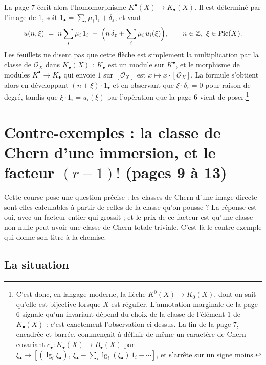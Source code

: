 \documentclass[11pt,a4paper]{article}
\begin{document}
La page 7 écrit alors l'homomorphisme $K^{\bullet}(X) \to K_{\bullet}(X)$. Il
est déterminé par l'image de $1$, soit
$1_{\bullet} = \sum_{i} \mu_{i} 1_{i} + \delta_{\varepsilon}$, et vaut
\[
  u(n, \xi) \;=\; n \sum_{i} \mu_{i}\,1_{i}
  \;+\; \Bigl( n\,\delta_{\varepsilon} + \sum_{i} \mu_{i}\,u_{i}(\xi) \Bigr),
  \qquad n \in \mathbb{Z},\ \xi \in \operatorname{Pic}(X).
\]
Les feuillets ne disent pas que cette flèche est simplement la multiplication par la classe de $\mathcal{O}_{X}$ dans
$K_{\bullet}(X)$ : $K_{\bullet}$ est un module sur $K^{\bullet}$, et le
morphisme de modules $K^{\bullet} \to K_{\bullet}$ qui envoie $1$ sur
$[\mathcal{O}_{X}]$ est $x \mapsto x \cdot [\mathcal{O}_{X}]$. La formule s'obtient alors en développant
$(n + \xi)\cdot 1_{\bullet}$ et en observant que $\xi \cdot \delta_{\varepsilon} = 0$
pour raison de degré, tandis que $\xi \cdot 1_{i} = u_{i}(\xi)$ par l'opération
que la page 6 vient de poser.\footnote{C'est donc, en langage moderne, la flèche
$K^{0}(X) \to K_{0}(X)$, dont on sait qu'elle est bijective lorsque $X$ est
régulier. L'annotation marginale de la page 6 signale qu'un invariant dépend
du choix de la classe de l'élément $1$ de $K_{\bullet}(X)$ : c'est exactement
l'observation ci-dessus. La fin de la page 7, encadrée et barrée, commençait à
définir de même un caractère de Chern covariant $c_{\bullet} :
K_{\bullet}(X) \to B_{\bullet}(X)$ par $\xi_{\bullet} \mapsto
[(\operatorname{lg}_{i}\xi_{\bullet}),\ \xi_{\bullet} - \sum_{i}
\operatorname{lg}_{i}(\xi_{\bullet})\,1_{i} - \cdots]$, et s'arrête sur un
signe moins.}

\section*{Contre-exemples : la classe de Chern d'une immersion, et le facteur $(r-1)!$ (pages 9 à 13)}

Cette course pose une question précise : les classes de Chern d'une image
directe sont-elles calculables à partir de celles de la classe qu'on pousse ?
La réponse est oui, avec un facteur entier qui grossit ; et le prix de ce
facteur est qu'une classe non nulle peut avoir une classe de Chern totale
triviale. C'est là le contre-exemple qui donne son titre à la chemise.

\subsection*{La situation}
\end{document}
